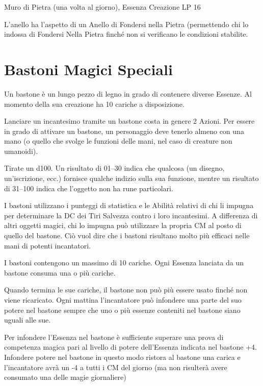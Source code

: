 \documentclass[a4paper,11pt,twoside,openany]{book}
\begin{document}
Muro di Pietra (una volta al giorno), Essenza Creazione LP 16

L'anello ha l'aspetto di un Anello di Fondersi nella Pietra (permettendo chi lo indossa di Fondersi Nella Pietra finché non si verificano le condizioni stabilite.

\pagebreak

\section{Bastoni Magici Speciali}

\label{bastoni-magici-speciali}

Un bastone è un lungo pezzo di legno in grado di contenere diverse Essenze. Al momento della sua creazione ha 10 cariche a disposizione.

Lanciare un incantesimo tramite un bastone costa in genere 2 Azioni. Per essere in grado di attivare un bastone, un personaggio deve tenerlo almeno con una mano (o quello che svolge le funzioni delle mani, nel caso di creature non umanoidi).

Tirate un d100. Un risultato di 01--30 indica che qualcosa (un disegno, un'iscrizione, ecc.) fornisce qualche indizio sulla sua funzione, mentre un risultato di 31--100 indica che l'oggetto non ha rune particolari.

I bastoni utilizzano i punteggi di statistica e le Abilità relativi di chi li impugna per determinare la DC dei Tiri Salvezza contro i loro incantesimi. A differenza di altri oggetti magici, chi lo impugna può utilizzare la propria CM al posto di quello del bastone. Ciò vuol dire che i bastoni risultano molto più efficaci nelle mani di potenti incantatori.

I bastoni contengono un massimo di 10 cariche. Ogni Essenza lanciata
da un bastone consuma una o più cariche.

Quando termina le sue cariche, il bastone non può più essere usato finché non viene ricaricato. Ogni mattina l'incantatore può infondere una parte del suo potere nel bastone sempre che uno o più essenze conteniti nel bastone siano uguali alle sue.

Per infondere l'Essenza nel bastone è sufficiente superare una prova di competenza magica pari al livello di potere dell'Essenza indicata nel bastone +4. Infondere potere nel bastone in questo modo ristora al bastone una carica e l'incantatore avrà un -4 a tutti i CM del giorno (ma non risulterà avere consumato una delle magie giornaliere)
\end{document}
